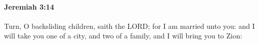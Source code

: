 
		\paragraph{Jeremiah 3:14} %
			\label{JEREMIAH-3-14}

			Turn, O backsliding children, saith the LORD; for I am married unto you: and I will take you one of a city, and two of a family, and I will bring you to Zion:



